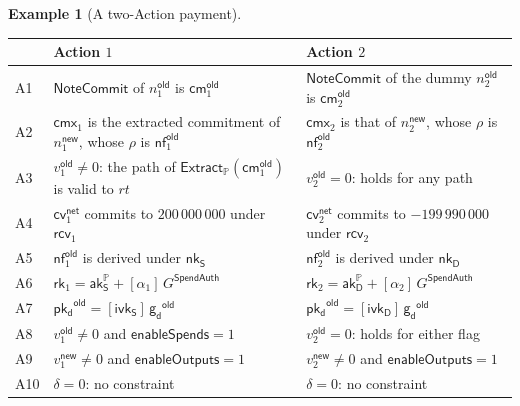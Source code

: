 \documentclass[11pt,a4paper]{article}
\theoremstyle{definition}
\newtheorem{example}[theorem]{Example}
\newcommand{\PP}{\mathbb{P}}
\newcommand{\nfsym}{\mathsf{nf}}
\newcommand{\cmsym}{\mathsf{cm}}
\newcommand{\cmx}{\mathsf{cmx}}
\newcommand{\cvsym}{\mathsf{cv}}
\newcommand{\rk}{\mathsf{rk}}
\newcommand{\NoteCommit}{\ensuremath{\mathsf{NoteCommit}}}
\newcommand{\Extract}{\ensuremath{\mathsf{Extract}}}
\newcommand{\aksym}{\ensuremath{\mathsf{ak}}}
\newcommand{\nksym}{\ensuremath{\mathsf{nk}}}
\newcommand{\ivk}{\ensuremath{\mathsf{ivk}}}
\newcommand{\pkd}{\ensuremath{\mathsf{pk_d}}}
\newcommand{\gd}{\ensuremath{\mathsf{g_d}}}
\newcommand{\rcv}{\ensuremath{\mathsf{rcv}}}
\begin{document}
\begin{example}[A two-Action payment]
\begin{center}\small
\setlength{\tabcolsep}{5pt}
\begin{tabular}{@{}lp{6.1cm}p{5.6cm}@{}}
\toprule
 & Action $1$ & Action $2$ \tabularnewline
\midrule
A1 & $\NoteCommit$ of $n^{\mathsf{old}}_1$ is $\cmsym^{\mathsf{old}}_1$
  & $\NoteCommit$ of the dummy $n^{\mathsf{old}}_2$ is
    $\cmsym^{\mathsf{old}}_2$ \tabularnewline
A2 & $\cmx_1$ is the extracted commitment of $n^{\mathsf{new}}_1$, whose
    $\rho$ is $\nfsym^{\mathsf{old}}_1$
  & $\cmx_2$ is that of $n^{\mathsf{new}}_2$, whose $\rho$ is
    $\nfsym^{\mathsf{old}}_2$ \tabularnewline
A3 & $v^{\mathsf{old}}_1 \neq 0$: the path of
    $\Extract_{\PP}(\cmsym^{\mathsf{old}}_1)$ is valid to $\mathit{rt}$
  & $v^{\mathsf{old}}_2 = 0$: holds for any path \tabularnewline
A4 & $\cvsym^{\mathsf{net}}_1$ commits to $200\,000\,000$ under $\rcv_1$
  & $\cvsym^{\mathsf{net}}_2$ commits to $-199\,990\,000$ under $\rcv_2$
    \tabularnewline
A5 & $\nfsym^{\mathsf{old}}_1$ is derived under $\nksym_{\mathsf{S}}$
  & $\nfsym^{\mathsf{old}}_2$ is derived under $\nksym_{\mathsf{D}}$
    \tabularnewline
A6 & $\rk_1 = \aksym^{\PP}_{\mathsf{S}} + [\alpha_1]\,G^{\mathsf{SpendAuth}}$
  & $\rk_2 = \aksym^{\PP}_{\mathsf{D}} + [\alpha_2]\,G^{\mathsf{SpendAuth}}$
    \tabularnewline
A7 & $\pkd^{\mathsf{old}} = [\ivk_{\mathsf{S}}]\,\gd^{\mathsf{old}}$
  & $\pkd^{\mathsf{old}} = [\ivk_{\mathsf{D}}]\,\gd^{\mathsf{old}}$
    \tabularnewline
A8 & $v^{\mathsf{old}}_1 \neq 0$ and $\mathsf{enableSpends} = 1$
  & $v^{\mathsf{old}}_2 = 0$: holds for either flag \tabularnewline
A9 & $v^{\mathsf{new}}_1 \neq 0$ and $\mathsf{enableOutputs} = 1$
  & $v^{\mathsf{new}}_2 \neq 0$ and $\mathsf{enableOutputs} = 1$
    \tabularnewline
A10 & $\delta = 0$: no constraint & $\delta = 0$: no constraint
  \tabularnewline
\bottomrule
\end{tabular}
\end{center}


\end{example}
\end{document}
